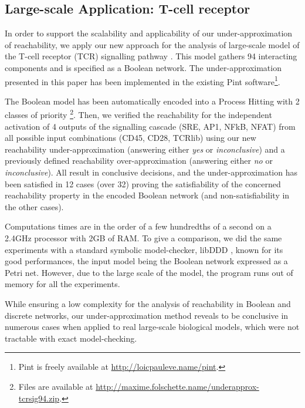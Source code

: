 \subsection{Large-scale Application: T-cell receptor}

In order to support the scalability and applicability of our under-approximation of reachability, we
apply our new approach for the analysis of large-scale model of the T-cell receptor (TCR)
signalling pathway \cite{tcrsig94}.
This model gathers 94 interacting components and is specified as a Boolean network.
The under-approximation presented in this paper has been implemented in the existing Pint
software\footnote{Pint is freely available at \url{http://loicpauleve.name/pint}.}.

The Boolean model has been automatically encoded into a Process Hitting with 2 classes of priority%
\footnote{Files are available at
\url{http://maxime.folschette.name/underapprox-tcrsig94.zip}.}.
Then, we verified the reachability for the independent activation of 4 outputs of the signalling
cascade (SRE, AP1, NFkB, NFAT) from all possible input combinations (CD45, CD28, TCRlib) using our
new reachability under-approximation (answering either \emph{yes} or \emph{inconclusive}) and a 
previously defined reachability over-approximation \cite{PMR12-MSCS} (answering either \emph{no} or
\emph{inconclusive}).
All result in conclusive decisions, and the under-approximation has been satisfied in 12 cases (over
32) proving the satisfiability of the concerned reachability property in the encoded Boolean network
(and non-satisfiability in the other cases).

Computations times are in the order of a few hundredths of a second on a 2.4GHz processor with 2GB
of RAM.
To give a comparison, we did the same experiments with a standard symbolic model-checker, libDDD
\cite{libddd}, known for its good performances, the input model being the Boolean network expressed
as a Petri net.
However, due to the large scale of the model, the program runs out of memory for all the experiments.

While ensuring a low complexity for the analysis of reachability in Boolean and discrete networks, our
under-approximation method reveals to be conclusive in numerous cases when applied to real
large-scale biological models, which were not tractable with exact model-checking.

